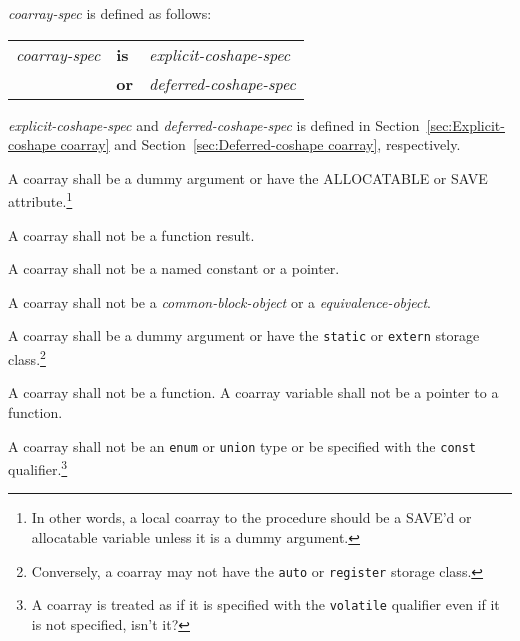 %
{\it coarray-spec} is defined as follows:
%
\begin{center}
 \begin{tabular}{lll}
  {\it coarray-spec} & {\bf is} & {\it explicit-coshape-spec}\\
                     & {\bf or} & {\it deferred-coshape-spec}\\
 \end{tabular}
\end{center}
%
{\it explicit-coshape-spec} and {\it deferred-coshape-spec} is defined in 
Section~\ref{sec:Explicit-coshape coarray} and
Section~\ref{sec:Deferred-coshape coarray}, respectively.


\begin{Constraints F}
\item A coarray shall be a dummy argument or have the ALLOCATABLE or SAVE 
attribute.\footnote
{In other words, a local coarray to the procedure should be a SAVE'd or allocatable
variable unless it is a dummy argument.}

\item A coarray shall not be a function result.

\item A coarray shall not be a named constant or a pointer. 

\item A coarray shall not be a {\it common-block-object}
or a {\it equivalence-object}.

%
%

\end{Constraints F}

\begin{Constraints C}
\item A coarray shall be a dummy argument or have the {\tt static} or {\tt extern} 
storage class.\footnote
{Conversely, a coarray may not have the {\tt auto} or {\tt register} 
storage class.}

\item A coarray shall not be a function. 
A coarray variable shall not be a pointer to a function.

\item A coarray shall not be an {\tt enum} or {\tt union} type or
be specified with the {\tt const} qualifier.\footnote
{A coarray is treated as if it is specified with the {\tt volatile} qualifier 
even if it is not specified, isn't it?}

\end{Constraints C}


